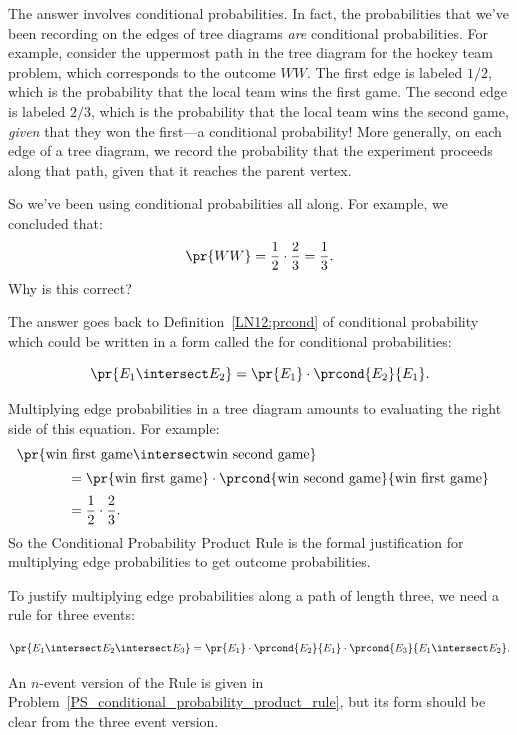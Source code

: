 The answer involves conditional probabilities.  In fact, the
probabilities that we've been recording on the edges of tree diagrams
\emph{are} conditional probabilities.  For example, consider the
uppermost path in the tree diagram for the hockey team problem, which
corresponds to the outcome $WW$.  The first edge is labeled $1/2$,
which is the probability that the local team wins the first game.  The
second edge is labeled $2 / 3$, which is the probability that the
local team wins the second game, \emph{given} that they won the
first---a conditional probability!  More generally, on each
edge of a tree diagram, we record the probability that the experiment
proceeds along that path, given that it reaches the parent vertex.

So we've been using conditional probabilities all along.  For
example, we concluded that:
%
\begin{equation*}
\pr{WW} = \frac{1}{2} \cdot \frac{2}{3}
	= \frac{1}{3}.
\end{equation*}
%
Why is this correct?

The answer goes back to Definition~\ref{LN12:prcond} of conditional probability
which could be written in a form called the  for
conditional probabilities:
%
\begin{rul*}
%
\[
    \pr{E_1 \intersect E_2} = \pr{E_1} \cdot \prcond{E_2}{E_1}.
\]
\end{rul*}
Multiplying edge probabilities in a tree diagram amounts to evaluating
the right side of this equation.  For example:
\begin{align*}
\lefteqn{\pr{\text{win first game} \intersect \text{win second game}}}
		\hspace{0.5in} \\[2pt]
	& = \pr{\text{win first game}} \cdot
            \prcond{\text{win second game}}{\text{win first game}} \\[2pt]
	& = \frac{1}{2} \cdot \frac{2}{3}.
\end{align*}
So the Conditional Probability Product Rule is the formal
justification for multiplying edge probabilities to get outcome
probabilities.

To justify multiplying edge probabilities along a path of length three, we need
a rule for three events:
\begin{rul*}
%
\[
    \pr{E_1 \intersect E_2 \intersect E_3} = \pr{E_1} \cdot
    \prcond{E_2}{E_1} \cdot
\prcond{E_3}{E_1 \intersect E_2}.
\]
\end{rul*}
An $n$-event version of the Rule is given in
Problem~\ref{PS_conditional_probability_product_rule}, but its form
should be clear from the three event version.


